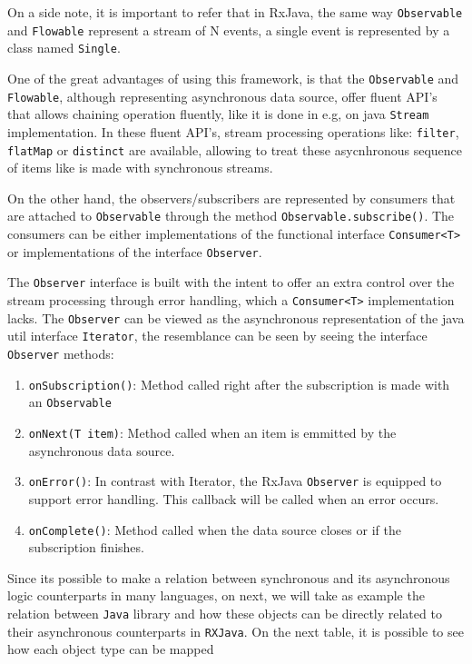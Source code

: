 On a side note, it is important to refer that in RxJava, the same way \texttt{Observable} and \texttt{Flowable} represent a stream of N events, a single event is represented by a class named \texttt{Single}. 

One of the great advantages of using this framework, is that the \texttt{Observable} and \texttt{Flowable}, although representing asynchronous data source, offer fluent API's that allows chaining operation fluently, like it is done in e.g, on java \texttt{Stream} implementation.
In these fluent API's, stream processing operations like: \texttt{filter}, \texttt{flatMap} or \texttt{distinct} are available, allowing to treat these asycnhronous sequence of items like is made with synchronous streams.

On the other hand, the observers/subscribers are represented by consumers that are attached to \texttt{Observable} through the method \texttt{Observable.subscribe()}.
The consumers can be either implementations of the functional interface \texttt{Consumer<T>} or implementations of the interface \texttt{Observer}.

The \texttt{Observer} interface is built with the intent to offer an extra control over the stream processing through error handling, which a \texttt{Consumer<T>} implementation lacks. The \texttt{Observer} can be viewed as the asynchronous representation of the java util interface \texttt{Iterator}, the resemblance can be seen by seeing the interface \texttt{Observer} methods:

\begin{enumerate}
     \item \texttt{onSubscription()}: Method called right after the subscription is made with an \texttt{Observable} 
	 \item \texttt{onNext(T item)}: Method called when an item is emmitted by the asynchronous data source.
	 \item \texttt{onError()}: In contrast with Iterator, the RxJava \texttt{Observer} is equipped to support error handling. This callback will be called when an error occurs.
	 \item \texttt{onComplete()}: Method called when the data source closes or if the subscription finishes.
\end{enumerate}	

Since its possible to make a relation between synchronous and its asynchronous logic counterparts in many languages, on next, we will take as example the relation between \texttt{Java} library and how these objects can be directly related to their asynchronous counterparts in \texttt{RXJava}.
On the next table, it is possible to see how each object type can be mapped 

